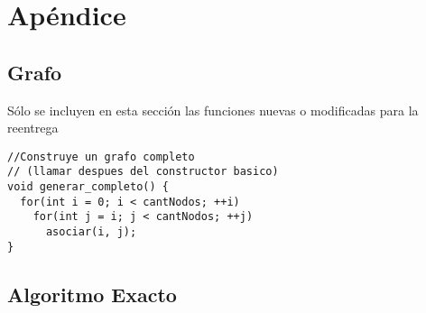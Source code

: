 \section{Apéndice}

\subsection{Grafo}

\par{Sólo se incluyen en esta sección las funciones nuevas o modificadas para
la reentrega}

\begin{lstlisting}
//Construye un grafo completo
// (llamar despues del constructor basico)
void generar_completo() {
  for(int i = 0; i < cantNodos; ++i)
    for(int j = i; j < cantNodos; ++j)
      asociar(i, j);
}
\end{lstlisting}

\subsection{Algoritmo Exacto}

